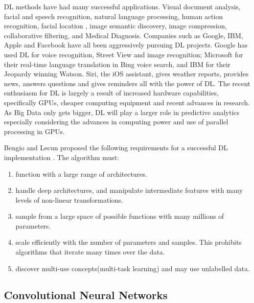 DL methods have had many successful applications.
Visual document analysis\citep{simard2003best}\citep{karnowski2010deep}, facial\citep{le2013building}\citep{farfade2015multi} and speech recognition, natural language processing, human action recognition\citep{ji20133d}\citep{mo2012survey}, facial location \citep{liu2014deep}, image semantic discovery\citep{liu2014deep}, image compression\citep{goyal2014object}, collaborative filtering\citep{chen2014big}, and Medical Diagnosis\citep{goyal2014object}.
Companies such as Google, IBM, Apple and Facebook have all been aggressively pursuing DL projects.
Google has used DL for voice recognition, Street View and image recognition; Microsoft for their real-time language translation in Bing voice search\citep{dahl2011large}, and IBM for their Jeopardy winning Watson\citep{ferrucci2013watson}\citep{chen2014big}.
Siri, the iOS assistant, gives weather reports, provides news, answers questions and gives reminders all with the power of DL\citep{chen2014big}.
The recent enthusiasm for DL is largely a result of increased hardware capabilities, specifically GPUs, cheaper computing equipment and recent advances in research\citep{dengthree}.
As Big Data only gets bigger, DL will play a larger role in predictive analytics especially considering the advances in computing power and use of parallel processing in GPUs\citep{chen2014big}.

Bengio and Lecun proposed the following requirements for a successful DL implementation\citep{bengio2007scaling} \citep{bengio2009learning}\citep{chen2014big}.
The algorithm must:

\begin{enumerate}
\item function with a large range of architectures.
\item handle deep architectures, and manipulate intermediate features with many levels of non-linear transformations.
\item sample from a large space of possible functions with many millions of parameters.
\item scale efficiently with the number of parameters and samples. This prohibits algorithms that iterate many times over the data.
\item discover multi-use concepts(multi-task learning) and may use unlabelled data.
\end{enumerate}

\subsection{Convolutional Neural Networks}

